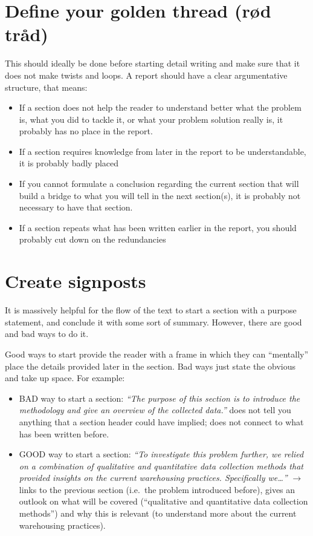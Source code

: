 \documentclass[
]{book}
\begin{document}
\hypertarget{define-your-golden-thread-ruxf8d-truxe5d}{%
\section{Define your golden thread (rød tråd)}\label{define-your-golden-thread-ruxf8d-truxe5d}}

This should ideally be done before starting detail writing
and make sure that it does not make twists and loops. A report
should have a clear argumentative structure, that means:

\begin{itemize}
\item
  If a section does not help the reader to understand better what
  the problem is, what you did to tackle it, or what your
  problem solution really is, it probably has no place in the
  report.
\item
  If a section requires knowledge from later in the report to be
  understandable, it is probably badly placed
\item
  If you cannot formulate a conclusion regarding the current
  section that will build a bridge to what you will tell in the
  next section(s), it is probably not necessary to have that
  section.
\item
  If a section repeats what has been written earlier in the
  report, you should probably cut down on the redundancies
\end{itemize}

\hypertarget{create-signposts}{%
\section{Create signposts}\label{create-signposts}}

It is massively helpful for the flow of the text
to start a section with a purpose statement, and conclude it with
some sort of summary. However, there are good and bad ways to do
it.

Good ways to start provide the reader with a frame in which they can
``mentally'' place the details provided later in the section. Bad ways
just state the obvious and take up space. For example:

\begin{itemize}
\item
  BAD way to start a section: \emph{``The purpose of this section is to
  introduce the methodology and give an overview of the collected
  data.''} does not tell you anything that a section header could
  have implied; does not connect to what has been written before.
\item
  GOOD way to start a section: \emph{``To investigate this problem further, we relied on a combination of qualitative and quantitative data collection methods that provided insights on the current warehousing practices. Specifically we\ldots{}''} \(\rightarrow\) links to the previous
  section (i.e.~the problem introduced before), gives an outlook on
  what will be covered (``qualitative and quantitative data collection methods'') and why this is relevant (to understand more
  about the current warehousing practices).
\end{itemize}
\end{document}
